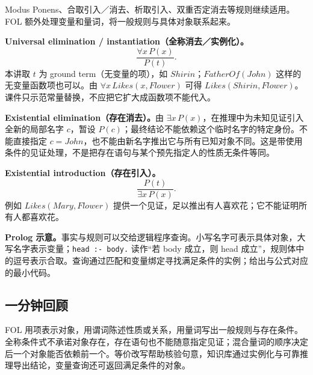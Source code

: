 
Modus Ponens、合取引入／消去、析取引入、双重否定消去等规则继续适用。FOL 额外处理变量和量词，将一般规则与具体对象联系起来。

\textbf{Universal elimination / instantiation（全称消去／实例化）。}
\[
 \frac{\forall x\,P(x)}{P(t)}.
\]
本讲取 $t$ 为 ground term（无变量的项），如 $Shirin$；$FatherOf(John)$ 这样的无变量函数项也可以。由 $\forall x\,Likes(x,Flower)$ 可得 $Likes(Shirin,Flower)$。课件只示范常量替换，不应把它扩大成函数项不能代入。

\textbf{Existential elimination（存在消去）。}由 $\exists x\,P(x)$，在推理中为未知见证引入全新的局部名字 $c$，暂设 $P(c)$；最终结论不能依赖这个临时名字的特定身份。不能直接指定 $c=John$，也不能由新名字推出它与所有已知对象不同。这是带使用条件的见证处理，不是把存在语句与某个预先指定人的性质无条件等同。

\textbf{Existential introduction（存在引入）。}
\[
 \frac{P(t)}{\exists x\,P(x)}.
\]
例如 $Likes(Mary,Flower)$ 提供一个见证，足以推出有人喜欢花；它不能证明所有人都喜欢花。

\textbf{Prolog 示意。}事实与规则可以交给逻辑程序查询。小写名字可表示具体对象，大写名字表示变量；\texttt{head :- body.} 读作“若 body 成立，则 head 成立”，规则体中的逗号表示合取。查询通过匹配和变量绑定寻找满足条件的实例；给出与公式对应的最小代码。

\subsection{一分钟回顾}

FOL 用项表示对象，用谓词陈述性质或关系，用量词写出一般规则与存在条件。全称条件式不承诺对象存在，存在语句也不能随意指定见证；混合量词的顺序决定后一个对象能否依赖前一个。等价改写帮助核验句意，知识库通过实例化与可靠推理导出结论，变量查询还可返回满足条件的对象。
\endgroup
